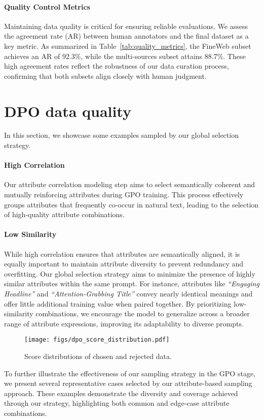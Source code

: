 \paragraph{Quality Control Metrics}
Maintaining data quality is critical for ensuring reliable evaluations. We assess the agreement rate (AR) between human annotators and the final dataset as a key metric. As summarized in Table~\ref{tab:quality_metrics}, the FineWeb subset achieves an AR of 92.3\%, while the multi-sources subset attains 88.7\%. These high agreement rates reflect the robustness of our data curation process, confirming that both subsets align closely with human judgment.


\section{DPO data quality} 

In this section, we showcase some examples sampled by our global selection strategy.
\paragraph{High Correlation} 
Our attribute correlation modeling step aims to select semantically coherent and mutually reinforcing attributes during GPO training. This process effectively groups attributes that frequently co-occur in natural text, leading to the selection of high-quality attribute combinations. 

\paragraph{Low Similarity}

While high correlation ensures that attributes are semantically aligned, it is equally important to maintain attribute diversity to prevent redundancy and overfitting. Our global selection strategy aims to minimize the presence of highly similar attributes within the same prompt. For instance, attributes like \emph{“Engaging Headline”} and \emph{“Attention-Grabbing Title”} convey nearly identical meanings and offer little additional training value when paired together. By prioritizing low-similarity combinations, we encourage the model to generalize across a broader range of attribute expressions, improving its adaptability to diverse prompts.

\begin{figure}[htbp] 
    \centering
        \texttt{[image: figs/dpo\_score\_distribution.pdf]}
    \caption{Score distributions of chosen and rejected data.}
    \label{fig:dpo_score_distribution}
\end{figure}
To further illustrate the effectiveness of our sampling strategy in the GPO stage, we present several representative cases selected by our attribute-based sampling approach. These examples demonstrate the diversity and coverage achieved through our strategy, highlighting both common and edge-case attribute combinations. 

